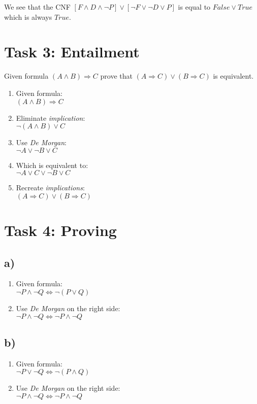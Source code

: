 \documentclass{article}
\begin{document}
  We see that the CNF $[F \wedge D \wedge \neg P] \vee [\neg F \vee \neg D \vee P]$  is equal to $False \vee True$ which is always $True$.
\section*{Task 3: Entailment}

Given formula $(A \wedge B) \Longrightarrow C$ prove that $(A \Longrightarrow C) \vee (B \Longrightarrow C)$ is equivalent.

\begin{enumerate}
  \item Given formula: \\ $(A \wedge B) \Longrightarrow C$ 
  \item Eliminate \emph{implication}: \\ $\neg(A \wedge B) \vee C$
  \item Use \emph{De Morgan}: \\ $\neg A \vee \neg B \vee C$
  \item Which is equivalent to: \\ $\neg A \vee C \vee \neg B \vee C$
  \item Recreate \emph{implications}: \\ $(A \Longrightarrow C) \vee (B \Longrightarrow C)$
\end{enumerate}

\section*{Task 4: Proving}
\subsection*{a)}
\begin{enumerate}
  \item Given formula: \\ $\neg P \wedge \neg Q \Leftrightarrow \neg(P \vee Q)$
  \item Use \emph{De Morgan} on the right side: \\ $\neg P \wedge \neg Q \Leftrightarrow \neg P \wedge \neg Q$
\end{enumerate}
\subsection*{b)}
\begin{enumerate}
  \item Given formula: \\ $\neg P \vee \neg Q \Leftrightarrow \neg(P \wedge Q)$
  \item Use \emph{De Morgan} on the right side: \\ $\neg P \wedge \neg Q \Leftrightarrow \neg P \wedge \neg Q $
\end{enumerate}
\end{document}
